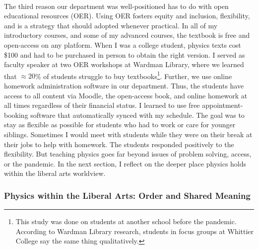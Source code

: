 \documentclass[../../../main.tex]{subfiles}
\begin{document}
\\
\vspace{0.25cm}
The third reason our department was well-positioned has to do with open educational resources (OER).  Using OER fosters equity and inclusion, flexibility, and is a strategy that should adopted whenever practical.  In all of my introductory courses, and some of my advanced courses, the textbook is free and open-access on any platform.  When I was a college student, physics texts cost \$100 and had to be purchased in person to obtain the right version.  I served as faculty speaker at two OER workshops at Wardman Library, where we learned that $\approx 20$\% of students struggle to buy textbooks\footnote{This study was done on students at another school before the pandemic.  According to Wardman Library research, students in focus groups at Whittier College say the same thing qualitatively.}.  Further, we use online homework administration software in our department.  Thus, the students have access to all content via Moodle, the open-access book, and online homework at all times regardless of their financial status.  I learned to use free appointment-booking software that automatically synced with my schedule.  The goal was to stay as flexible as possible for students who had to work or care for younger siblings.  Sometimes I would meet with students while they were on their break at their jobs to help with homework.  The students responded positively to the flexibility.  But teaching physics goes far beyond issues of problem solving, access, or the pandemic.  In the next section, I reflect on the deeper place physics holds within the liberal arts worldview.

\subsubsection{Physics within the Liberal Arts: Order and Shared Meaning}
\end{document}
